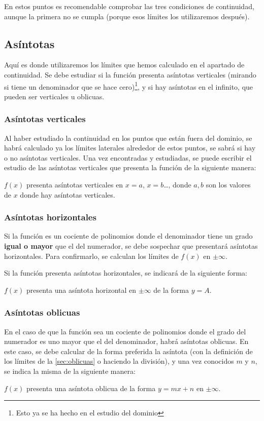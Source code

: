\documentclass[sans]{apuntes}
\begin{document}
En estos puntos es recomendable comprobar las tres condiciones de continuidad, aunque la primera no se cumpla (porque esos límites los utilizaremos después).

\subsection{Asíntotas}
Aquí es donde utilizaremos los límites que hemos calculado en el apartado de continuidad. Se debe estudiar si la función presenta asíntotas verticales (mirando si tiene un denominador que se hace cero)\footnote{Esto ya se ha hecho en el estudio del dominio}, y si hay asíntotas en el infinito, que pueden ser verticales u oblicuas.

\subsubsection{Asíntotas verticales}
Al haber estudiado la continuidad en los puntos que están fuera del dominio, se habrá calculado ya los límites laterales alrededor de estos puntos, se sabrá si hay o no asíntotas verticales. Una vez encontradas y estudiadas, se puede escribir el estudio de las asíntotas verticales que presenta la función de la siguiente manera:
\par $f(x)$ presenta asíntotas verticales en $x = a$, $x = b$\dots, donde $a, b$ son los valores de $x$ donde hay asíntotas verticales.

\subsubsection{Asíntotas horizontales}
Si la función es un cociente de polinomios donde el denominador tiene un grado \textbf{igual o mayor} que el del numerador, se debe sospechar que presentará asíntotas horizontales. Para confirmarlo, se calculan los límites de $f(x)$ en $\pm \infty$.
\par Si la función presenta asíntotas horizontales, se indicará de la siguiente forma:
\par $f(x)$ presenta una asíntota horizontal en $\pm\infty$ de la forma $y = A$.

\subsubsection{Asíntotas oblicuas}
En el caso de que la función sea un cociente de polinomios donde el grado del numerador es uno mayor que el del denominador, habrá asíntotas oblicuas. En este caso, se debe calcular de la forma preferida la asíntota (con la definición de los límites de la \autoref{sec:oblicuas} o haciendo la división), y una vez conocidos $m$ y $n$, se indica la misma de la siguiente manera:
\par $f(x)$ presenta una asíntota oblicua de la forma $y = mx + n$ en $\pm\infty$.
\end{document}
